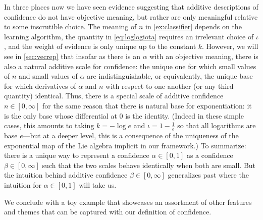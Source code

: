 \documentclass{uai2023}
\theoremstyle{plain}
\theoremstyle{definition}
\begin{document}
In three places now we have seen evidence suggesting that 
additive descriptions of confidence do not have objective meaning,
but rather are only meaningful relative to some inscrutible choice.
The meaning of $n$ in \cref{ex:classifier} depends on the learning algorithm,
the quantity in \eqref{eq:loglogiota} requires an irrelevant choice of $\iota$,
and the weight of evidence is only unique up to the constant $k$.
However, we will see in \cref{sec:vecrep} that insofar as there is an 
$\alpha$ with an objective meaning, there is also a natural additive 
scale for confidence: the unique one for which small values of $n$ and 
small values of $\alpha$ are indistinguishable, or equivalently,
the unique base for which derivatives of $\alpha$ and $n$ with respect
to one another (or any third quantity) identical.
Thus, there is a special scale of additive confidence $n \in [0,\infty]$
for the same reason that there is natural base for exponentiation: 
it is the only base whose differential at 0 is the identity. 
(Indeed in these simple cases, this amounts to taking $k = -\log e$
and $\iota = 1-\frac1e$ so that all logarithms are base $e$---but at a
deeper level, this is a consequence of the uniqueness of the
exponential map of the Lie algebra implicit in our framework.) 
To summarize: there is a unique way to represent a confidence
$\alpha \in [0,1]$ as a confidence $\beta \in [0, \infty]$
such that the two scales behave identically when both are small. 
But the intuition behind additive confidence $\beta \in [0, \infty]$ 
generalizes past where the intuition for $\alpha \in [0,1]$ will take us.



We conclude with a toy example that showcases an assortment of other features and themes that can be captured with our definition of confidence.
	
\end{document}
